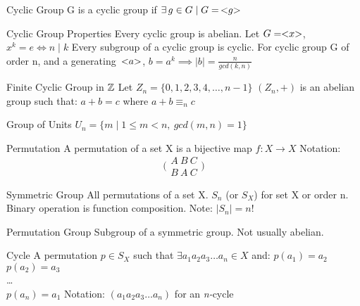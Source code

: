 \begin{flashcard}[Definition]{Cyclic Group}
  G is a cyclic group if $\exists\,g \in G \mid G =\, < \negthickspace g \negthickspace >$
\end{flashcard}

\begin{flashcard}[Definition]{Cyclic Group Properties}
  Every cyclic group is abelian.
  \vfill
  Let $G = < \negthickspace x \negthickspace >$, \quad $x^k = e \iff n \mid k$
  \vfill
  Every subgroup of a cyclic group is cyclic.
  \vfill
  For cyclic group G of order n, and a generating~$< \negthickspace a \negthickspace >$, \quad $b = a^k \implies \mid b \mid = \frac{n}{gcd(k,n)}$
\end{flashcard}

\begin{flashcard}[Definition]{Finite Cyclic Group in $\mathbb{Z}$}
  Let $Z_n = \{ 0,1,2,3,4, \dots , n - 1 \}$
  \vfill
  $(Z_n, +)$ is an abelian group such that:
  \vfill
  $a + b = c$ where $a + b \equiv_n c$
\end{flashcard}

\begin{flashcard}[Definition]{Group of Units}
  $U_n = \{ m \mid 1 \leq m < n,\ gcd(m,n) = 1 \}$
\end{flashcard}

\begin{flashcard}[Definition]{Permutation}
  A permutation of a set X is a bijective map $f: X \to X$
  \vfill
  Notation: \[
    \bigl(\begin{smallmatrix}
      A\ B\ C \\ B\ A\ C
    \end{smallmatrix}\bigr)
  \]
\end{flashcard}

\begin{flashcard}[Definition]{Symmetric Group}
  All permutations of a set X.
  \vfill
  $S_n$ (or $S_X$) for set X or order n.
  \vfill
  Binary operation is function composition.
  \vfill
  Note: $\mid S_n \mid = n!$
\end{flashcard}

\begin{flashcard}[Definition]{Permutation Group}
  Subgroup of a symmetric group.
  \vfill
  Not usually abelian.
\end{flashcard}

\begin{flashcard}[Definition]{Cycle}
  A permutation $p \in S_X$ such that $\exists a_1 a_2 a_3 \dots  a_n \in X$ and:
  \vfill
  $p(a_1) = a_2$ \\
  $p(a_2) = a_3$ \\
  \dots \\
  $p(a_n) = a_1$
  \vfill
  Notation: $(a_1 a_2 a_3 \dots a_n)$ for an \emph{n-}cycle
\end{flashcard}

